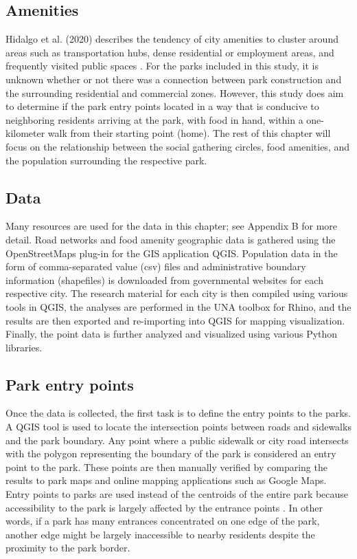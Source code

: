 \begin{multicols}{2}
\subsection{Amenities}
Hidalgo et al. (2020) describes the tendency of city amenities to cluster around areas such as transportation hubs, dense residential or employment areas, and frequently visited public spaces \cite{hidalgo_amenity_2020}. For the parks included in this study, it is unknown whether or not there was a connection between park construction and the surrounding residential and commercial zones. However, this study does aim to determine if the park entry points located in a way that is conducive to neighboring residents arriving at the park, with food in hand, within a one-kilometer walk from their starting point (home). The rest of this chapter will focus on the relationship between the social gathering circles, food amenities, and the population surrounding the respective park. 

\subsection{Data}
Many resources are used for the data in this chapter; see Appendix B for more detail. Road networks and food amenity geographic data is gathered using the OpenStreetMaps plug-in for the GIS application QGIS. Population data in the form of comma-separated value (csv) files and administrative boundary information (shapefiles) is downloaded from governmental websites for each respective city. The research material for each city is then compiled using various tools in QGIS, the analyses are performed in the UNA toolbox for Rhino, and the results are then exported and re-importing into QGIS for mapping visualization. Finally, the point data is further analyzed and visualized using various Python libraries. 

\subsection{Park entry points}
Once the data is collected, the first task is to define the entry points to the parks. A QGIS tool is used to locate the intersection points between roads and sidewalks and the park boundary. Any point where a public sidewalk or city road intersects with the polygon representing the boundary of the park is considered an entry point to the park. These points are then manually verified by comparing the results to park maps and online mapping applications such as Google Maps. Entry points to parks are used instead of the centroids of the entire park because accessibility to the park is largely affected by the entrance points \cite{basil_read_implementing_2021}\cite{nicholls_measuring_2001}. In other words, if a park has many entrances concentrated on one edge of the park, another edge might be largely inaccessible to nearby residents despite the proximity to the park border.

\end{multicols}

